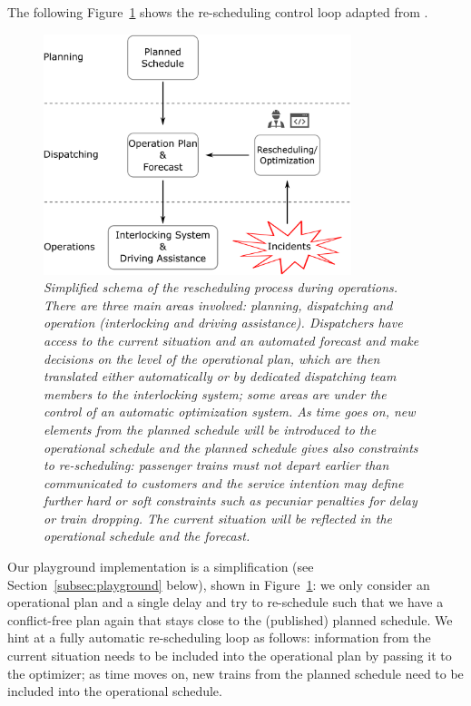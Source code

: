 \documentclass{article}
\begin{document}
The following Figure~\ref{fig:introduction_operations} shows the re-scheduling control loop adapted from \cite{rcsbrochure,rcswhitepaper}. 
%
\begin{figure}[hbtp]
	\centering
  \includegraphics[width=0.8\textwidth]{Figures/rescheduling_schema_heute.pdf}
	\caption{\textit{Simplified schema of the rescheduling process during operations. There are three main areas involved: \emph{planning}, \emph{dispatching} and \emph{operation} (interlocking and driving assistance). Dispatchers have access to the current situation and an automated forecast and make decisions on the level of the operational plan, which are then translated either automatically or by dedicated dispatching team members to the interlocking system; some areas are under the control of an automatic optimization system. As time goes on, new elements from the planned schedule will be introduced to the operational schedule and the planned schedule gives also constraints to re-scheduling: passenger trains must not depart earlier than communicated to customers and the service intention may define further hard or soft constraints such as pecuniar penalties for delay or train dropping. The current situation will be reflected in the operational schedule and the forecast.}}
	\label{fig:introduction_operations}
\end{figure}
%

Our playground implementation is a simplification (see Section~\ref{subsec:playground} below), shown in Figure~\ref{fig:introduction_operations}: we only consider an operational plan and a single delay and try to re-schedule such that we have a conflict-free plan again that stays close to the (published) planned schedule. We hint at a fully automatic re-scheduling loop as follows: information from the current situation needs to be included into the operational plan by passing it to the optimizer; as time moves on, new trains from the planned schedule need to be included into the operational schedule.
\end{document}
